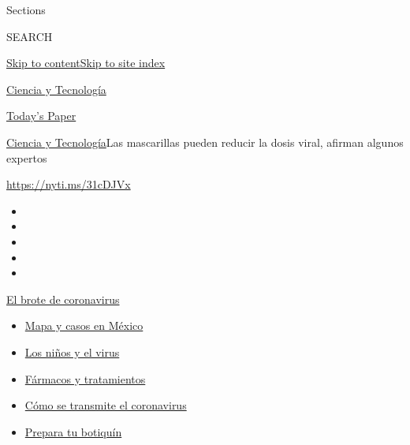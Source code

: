 Sections

SEARCH

\protect\hyperlink{site-content}{Skip to
content}\protect\hyperlink{site-index}{Skip to site index}

\href{https://www.nytimes.com/es/section/ciencia-y-tecnologia}{Ciencia y
Tecnología}

\href{https://myaccount.nytimes.com/auth/login?response_type=cookie\&client_id=vi}{}

\href{https://www.nytimes.com/section/todayspaper}{Today's Paper}

\href{/es/section/ciencia-y-tecnologia}{Ciencia y
Tecnología}\textbar{}Las mascarillas pueden reducir la dosis viral,
afirman algunos expertos

\url{https://nyti.ms/31cDJVx}

\begin{itemize}
\item
\item
\item
\item
\item
\end{itemize}

\href{https://www.nytimes.com/es/spotlight/coronavirus?action=click\&pgtype=Article\&state=default\&region=TOP_BANNER\&context=storylines_menu}{El
brote de coronavirus}

\begin{itemize}
\tightlist
\item
  \href{https://www.nytimes.com/es/interactive/2020/espanol/america-latina/coronavirus-en-mexico.html?action=click\&pgtype=Article\&state=default\&region=TOP_BANNER\&context=storylines_menu}{Mapa
  y casos en México}
\item
  \href{https://www.nytimes.com/es/2020/07/31/espanol/ciencia-y-tecnologia/ninos-contagio-coronavirus.html?action=click\&pgtype=Article\&state=default\&region=TOP_BANNER\&context=storylines_menu}{Los
  niños y el virus}
\item
  \href{https://www.nytimes.com/es/interactive/2020/science/coronavirus-tratamientos-curas.html?action=click\&pgtype=Article\&state=default\&region=TOP_BANNER\&context=storylines_menu}{Fármacos
  y tratamientos}
\item
  \href{https://www.nytimes.com/es/2020/07/06/espanol/ciencia-y-tecnologia/coronavirus-transmision-aire.html?action=click\&pgtype=Article\&state=default\&region=TOP_BANNER\&context=storylines_menu}{Cómo
  se transmite el coronavirus}
\item
  \href{https://www.nytimes.com/es/2020/07/14/espanol/estilos-de-vida/botiquin-medicina-coronavirus.html?action=click\&pgtype=Article\&state=default\&region=TOP_BANNER\&context=storylines_menu}{Prepara
  tu botiquín}
\end{itemize}

